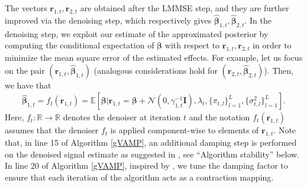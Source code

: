 The vectors $\bm r_{1, t}, \bm r_{2, t}$ are obtained after the LMMSE step, and they are further improved via the denoising step, which respectively gives $\hat{\bm \beta}_{1, t}, \hat{\bm \beta}_{2, t}$. In the denoising step, we exploit our estimate of the approximated posterior by computing the conditional expectation of $\bm\beta$ with respect to $\bm r_{1, t}, \bm r_{2, t}$ in order to minimize the mean square error of the estimated effects. For example, let us focus on the pair $(\bm r_{1, t}, \hat{\bm \beta}_{1, t})$  (analogous considerations hold for $(\bm r_{2, t}, \hat{\bm \beta}_{2, t})$). Then, we have that 
\begin{align}
    \label{denoiser_def}
\hat{\bm \beta}_{1, t} = f_t(\bm{r}_{1,t}) = \mathbb{E}[\bm{\beta} | \bm{r}_{1,t} = \bm{\beta} + \mathcal{N}(0, \gamma_{1,t}^{-1}\bm{I}), \lambda_t, \{\pi_{t, l}\}_{l=1}^L, \{ \sigma_{t,l}^2 \}_{l=1}^L].
\end{align}
Here, $f_t:\mathbb{R} \to \mathbb{R}$ denotes the denoiser at iteration $t$ and the notation $f_t(\bm{r}_{1,t})$ assumes that the denoiser $f_t$ is applied component-wise to elements of $\bm{r}_{1,t}$. Note that, in line 15 of Algorithm \ref{gVAMP}, an additional damping step is performed on the denoised signal estimate as suggested in \cite{rangan_vector_2019}, see ``Algorithm stability'' below. In line 20 of Algorithm \ref{gVAMP}, inspired by \cite{VAMP_MRI,sarkar2021mri}, we tune the damping factor to ensure that each iteration of the algorithm acts as a contraction mapping.

